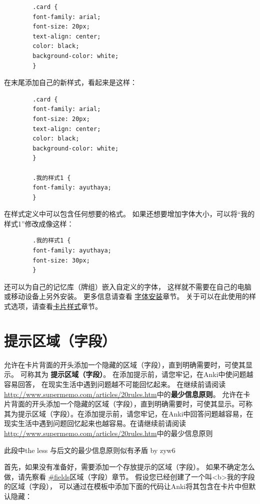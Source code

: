 \documentclass[a4paper]{book}
\begin{document}
	\begin{shaded}\begin{verbatim}
		.card {
		font-family: arial;
		font-size: 20px;
		text-align: center;
		color: black;
		background-color: white;
		}
		\end{verbatim}\end{shaded}
	在末尾添加自己的新样式，看起来是这样：
	\begin{shaded}\begin{verbatim}
		.card {
		font-family: arial;
		font-size: 20px;
		text-align: center;
		color: black;
		background-color: white;
		}
		
		.我的样式1 {
		font-family: ayuthaya;
		}
		\end{verbatim}\end{shaded}
	在样式定义中可以包含任何想要的格式。 如果还想要增加字体大小，可以将“我的样式1”修改成像这样：
	
	\begin{shaded}\begin{verbatim}
		.我的样式1 {
		font-family: ayuthaya;
		font-size: 30px;
		}
		\end{verbatim}\end{shaded}
	还可以为自己的记忆库（牌组）嵌入自定义的字体， 这样就不需要在自己的电脑或移动设备上另外安装。 更多信息请查看
	\hyperref[installingfonts]{字体安装}章节。
	关于可以在此使用的样式选项，请查看\hyperref[cardstyling]{卡片样式}章节。
	
	\section{提示区域（字段）}
	允许在卡片背面的开头添加一个隐藏的区域（字段），直到明确需要时，可使其显示。 可称其为
	\textbf{提示区域（字段）}。 在添加提示前，请您牢记，在Anki中使问题越容易回答， 在现实生活中遇到问题越不可能回忆起来。 在继续前请阅读
	\url{http://www.supermemo.com/articles/20rules.htm}中的\textbf{最少信息原则}。
	允许在卡片背面的开头添加一个隐藏的区域（字段），直到明确需要时，可使其显示。可称其为提示区域（字段）。在添加提示前，请您牢记，在Anki中回答问题越容易，在现实生活中遇到问题回忆起来也越容易。在请继续前请阅读\url{http://www.supermemo.com/articles/20rules.htm}中的最少信息原则
	
	此段中the less 与后文的最少信息原则似有矛盾 by zyw6
	
	首先，如果没有准备好，需要添加一个存放提示的区域（字段）。 如果不确定怎么做，请先察看
	\url{#fields}区域（字段）章节。
	假设您已经创建了一个叫<b>我的字段的区域（字段）， 可以通过在模板中添加下面的代码让Anki将其包含在卡片中但默认隐藏：
	
\end{document}

